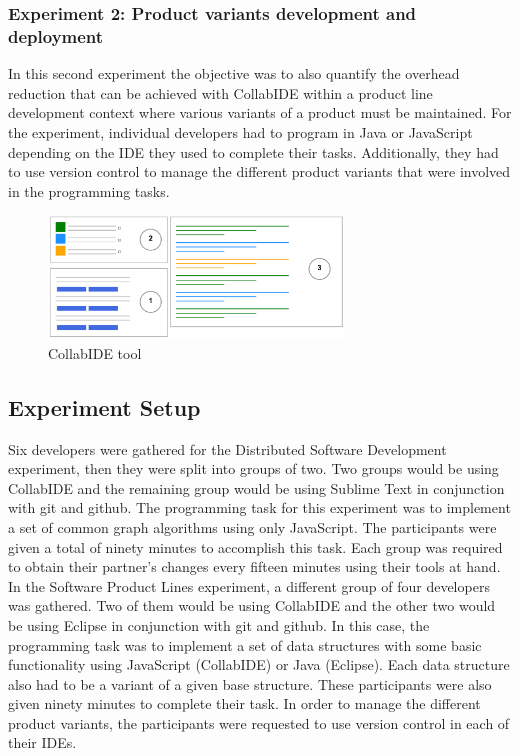 \subsubsection{Experiment 2: Product variants development and deployment}
In this second experiment the objective was to also quantify the overhead reduction that can be achieved with CollabIDE within a product line development context where various variants of a product must be maintained.
For the experiment, individual developers had to program in Java or JavaScript depending on the IDE they used to complete their tasks. Additionally, they had to use version control to manage the different product variants that were involved in the programming tasks.

\begin{figure}[htbp]
  \centering
  \includegraphics[width=0.7\textwidth]{img/collabIDEGeneral}
  \caption{CollabIDE tool}
  \label{fig:collabide}
\end{figure}

\subsection{Experiment Setup}

Six developers were gathered for the Distributed Software Development experiment, then they were split into groups of two. Two groups would be using CollabIDE and the remaining group would be using Sublime Text in conjunction with git and github. The programming task for this experiment was to implement a set of common graph algorithms using only JavaScript. The participants were given a total of ninety minutes to accomplish this task. Each group was required to obtain their partner’s changes every fifteen minutes using their tools at hand.
In the Software Product Lines experiment, a different group of four developers was gathered. Two of them would be using CollabIDE and the other two would be using Eclipse in conjunction with git and github. In this case, the programming task was to implement a set of data structures with some basic functionality using JavaScript (CollabIDE) or Java (Eclipse). Each data structure also had to be a variant of a given base structure. These participants were also given ninety minutes to complete their task. In order to manage the different product variants, the participants were requested to use version control in each of their IDEs.


